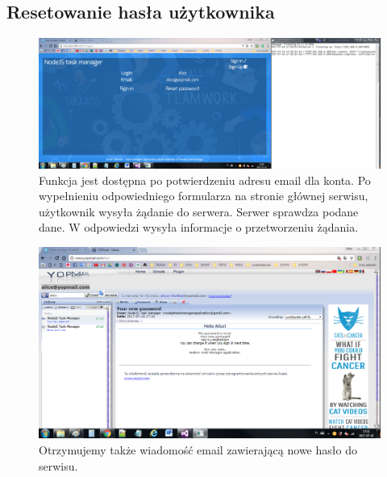 \documentclass[12pt]{report}
\begin{document}
\subsection{Resetowanie hasła użytkownika}
\begin{figure}[!hb]
\centering
\includegraphics[width=\textwidth,height=\textheight,keepaspectratio]{52.png}
\captionsetup{labelformat=empty}
\caption[]{Funkcja jest dostępna po potwierdzeniu adresu email dla konta. 
Po wypełnieniu odpowiedniego formularza na stronie głównej serwisu, użytkownik wysyła żądanie do serwera. 
Serwer sprawdza podane dane. W odpowiedzi wysyła informacje o przetworzeniu żądania.}
\end{figure}
\begin{figure}[!hb]
\centering
\includegraphics[width=\textwidth,height=\textheight,keepaspectratio]{53.png}
\captionsetup{labelformat=empty}
\caption[]{Otrzymujemy także wiadomość email zawierającą nowe hasło do serwisu.}
\end{figure}

\newpage 
\end{document}
